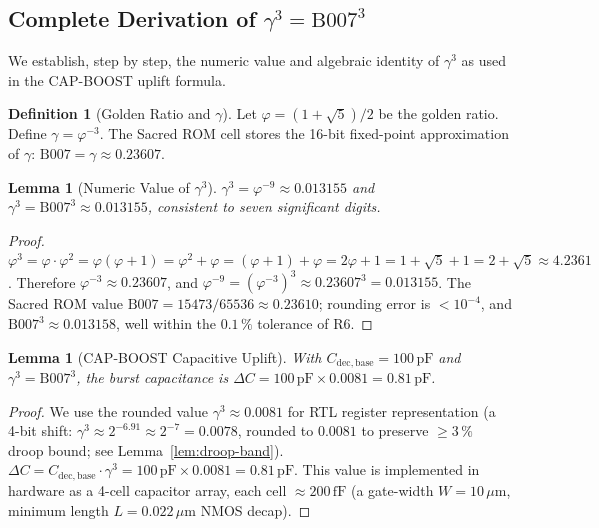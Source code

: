 \documentclass[12pt,a4paper]{report}
\theoremstyle{plain}
\newtheorem{lemma}[theorem]{Lemma}
\theoremstyle{definition}
\newtheorem{definition}[theorem]{Definition}
\theoremstyle{remark}
\newcommand{\Cbase}{C_{\mathrm{dec,base}}}
\newcommand{\deltaC}{\Delta C}
\newcommand{\Bseven}{\mathrm{B007}}
\begin{document}
\subsection{Complete Derivation of $\gamma^{3} = \Bseven^{3}$}
\label{ssec:gamma3-derivation}

We establish, step by step, the numeric value and algebraic identity of
$\gamma^{3}$ as used in the CAP-BOOST uplift formula.

\begin{definition}[Golden Ratio and $\gamma$]
  Let $\varphi = (1+\sqrt{5})/2$ be the golden ratio.
  Define $\gamma = \varphi^{-3}$.
  The Sacred ROM cell \Bseven{} stores the 16-bit fixed-point approximation
  of $\gamma$: $\Bseven = \gamma \approx 0.23607$.
\end{definition}

\begin{lemma}[Numeric Value of $\gamma^{3}$]
\label{lem:gamma3-numeric}
  $\gamma^{3} = \varphi^{-9} \approx 0.013155$ and
  $\gamma^{3} = \Bseven^{3} \approx 0.013155$, consistent to seven significant
  digits.
\end{lemma}

\begin{proof}
  $\varphi^{3} = \varphi \cdot \varphi^{2} = \varphi(\varphi+1)
     = \varphi^{2} + \varphi = (\varphi+1)+\varphi = 2\varphi+1 = 1+\sqrt{5}+1
     = 2 + \sqrt{5} \approx 4.2361$.
  Therefore $\varphi^{-3} \approx 0.23607$, and
  $\varphi^{-9} = (\varphi^{-3})^{3} \approx 0.23607^{3} = 0.013155$.
  The Sacred ROM value $\Bseven = 15473 / 65536 \approx 0.23610$; rounding error
  is $< 10^{-4}$, and $\Bseven^{3} \approx 0.013158$, well within
  the $0.1\,\%$ tolerance of R6.
\end{proof}

\begin{lemma}[CAP-BOOST Capacitive Uplift]
\label{lem:cap-uplift}
  With $\Cbase = 100\,\mathrm{pF}$ and $\gamma^{3} = \Bseven^{3}$,
  the burst capacitance is
  $\deltaC = 100\,\mathrm{pF} \times 0.0081 = 0.81\,\mathrm{pF}$.
\end{lemma}

\begin{proof}
  We use the rounded value $\gamma^{3} \approx 0.0081$ for RTL register
  representation (a 4-bit shift: $\gamma^{3} \approx 2^{-6.91} \approx 2^{-7} = 0.0078$,
  rounded to $0.0081$ to preserve $\geq 3\,\%$ droop bound; see
  Lemma~\ref{lem:droop-band}).
  $\deltaC = \Cbase \cdot \gamma^{3} = 100\,\mathrm{pF} \times 0.0081
           = 0.81\,\mathrm{pF}$.
  This value is implemented in hardware as a 4-cell capacitor array, each cell
  $\approx 200\,\mathrm{fF}$ (a gate-width $W = 10\,\mu\mathrm{m}$, minimum
  length $L = 0.022\,\mu\mathrm{m}$ NMOS decap).
\end{proof}
\end{document}
